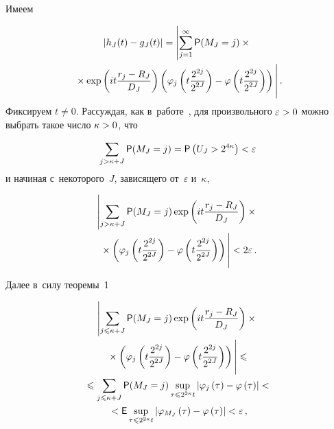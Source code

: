 \begin{multicols}{2}
\vspace*{-2pt}

\noindent
Имеем

\vspace*{-4pt}

\noindent
\begin{multline*} %
\abs{h_J(t)-g_J(t)}=
\left\vert \sum\limits_{j=1}^{\infty}{\sf P}(M_J=j)\times{}\right.\\
\left.{}\times \exp\left(it\fr{r_{j}-
R_J}{D_J}\right)\left(\varphi_j\left(t\fr{2^{2j}}{2^{2J}}\right)-
\varphi\left(t\fr{2^{2j}}{2^{2J}}\right)\right)
\vphantom{\sum\limits_{j=1}^{\infty}}
\right\vert.
\end{multline*}
Фиксируем $t\neq0$. Рассуждая, как в~работе~\cite{KZ16}, 
для произвольного $\varepsilon\hm>0$ можно выбрать такое число 
$\kappa\hm>0$, что

\vspace*{4pt}

\noindent
\begin{equation*}
\sum\limits_{j>\kappa +J}{\sf P}(M_J=j)={\sf P}\left(U_J>2^{4\kappa}\right)<\varepsilon
\end{equation*}
и начиная с~некоторого~$J$, зависящего от~$\varepsilon$ и~$\kappa$,

\vspace*{-1pt}

\noindent
\begin{multline*}
\left\vert\sum\limits_{j>\kappa + J}{\sf P}(M_J=j)\exp\left(
it\fr{r_{j}-R_J}{D_J}\right)\times{}\right.\\
\left.{}\times \left(\varphi_j\left(t
\fr{2^{2j}}{2^{2J}}\right)-\varphi\left(t\fr{2^{2j}}{2^{2J}}\right)
\right)
\vphantom{\sum\limits_{j>\kappa + J} \fr{r_{j}-R_J}{D_J}}
\right\vert
<2\varepsilon\,.
\end{multline*}

\vspace*{-2pt}

\noindent
Далее в~силу теоремы~1

\vspace*{-3pt}

\noindent
\begin{multline*}
\left\vert \sum\limits_{j\leqslant\kappa + J}{\sf P}(M_J=j)
\exp\left(it\fr{r_{j}-R_J}{D_J}\right)\times{}\right.\\
\left. {}\times\left(\varphi_j
\left(t\fr{2^{2j}}{2^{2J}}\right)-\varphi\left(t\fr{2^{2j}}{2^{2J}}
\right)\right)
\vphantom{\sum\limits_{j>\kappa + J} \fr{r_{j}-R_J}{D_J}}
\right\vert 
\leqslant{}
\\
{}\leqslant\sum\limits_{j\leqslant\kappa +J}{\sf P}(M_J=j)
\sup\limits_{\tau\leqslant 2^{2\kappa} t}\abs{\varphi_j\left(
\tau\right)-\varphi\left(\tau\right)}<{}\\
{}<{\sf E}
\sup\limits_{\tau\leqslant 2^{2\kappa} t}
\abs{\varphi_{M_J}\left(\tau\right)-\varphi\left(\tau\right)}
<\varepsilon\,,
\end{multline*}


\end{multicols}
